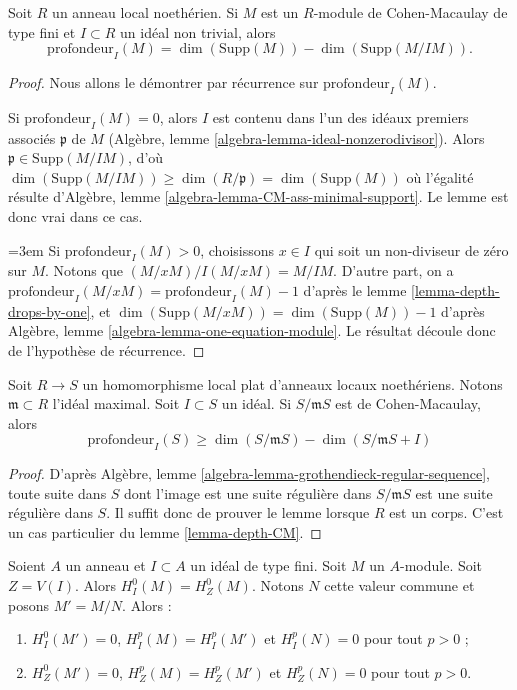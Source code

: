 \begin{lemma}
\label{lemma-depth-CM}
Soit $R$ un anneau local noethérien. Si $M$ est un
$R$-module de Cohen-Macaulay de type fini et $I \subset R$ un idéal non trivial, alors
$$
\text{profondeur}_I(M) = \dim(\text{Supp}(M)) - \dim(\text{Supp}(M/IM)).
$$
\end{lemma}

\begin{proof}
Nous allons le démontrer par récurrence sur $\text{profondeur}_I(M)$.

\medskip\noindent
Si $\text{profondeur}_I(M) = 0$, alors $I$ est contenu dans l'un des idéaux premiers
associés $\mathfrak p$ de $M$ (Algèbre, lemme \ref{algebra-lemma-ideal-nonzerodivisor}).
Alors $\mathfrak p \in \text{Supp}(M/IM)$, d'où
$\dim(\text{Supp}(M/IM)) \geq \dim(R/\mathfrak p) = \dim(\text{Supp}(M))$
où l'égalité résulte d'Algèbre, lemme \ref{algebra-lemma-CM-ass-minimal-support}.
Le lemme est donc vrai dans ce cas.

\medskip\noindent
{\emergencystretch=3em Si $\text{profondeur}_I(M) > 0$, choisissons $x \in I$ qui soit un non-diviseur de zéro sur $M$.
Notons que $(M/xM)/I(M/xM) = M/IM$. D'autre part, on a
$\text{profondeur}_I(M/xM) = \text{profondeur}_I(M) - 1$
d'après le lemme \ref{lemma-depth-drops-by-one}, et $\dim(\text{Supp}(M/xM)) = \dim(\text{Supp}(M)) -  1$
d'après Algèbre, lemme \ref{algebra-lemma-one-equation-module}.
Le résultat découle donc de l'hypothèse de récurrence.\par}
\end{proof}

\begin{lemma}
\label{lemma-depth-flat-CM}
Soit $R \to S$ un homomorphisme local plat d'anneaux locaux noethériens.
Notons $\mathfrak m \subset R$ l'idéal maximal.
Soit $I \subset S$ un idéal.
Si $S/\mathfrak mS$ est de Cohen-Macaulay, alors
$$
\text{profondeur}_I(S) \geq \dim(S/\mathfrak mS) - \dim(S/\mathfrak mS + I)
$$
\end{lemma}

\begin{proof}
D'après Algèbre, lemme \ref{algebra-lemma-grothendieck-regular-sequence}, toute suite dans $S$
dont l'image est une suite régulière dans $S/\mathfrak mS$
est une suite régulière dans $S$.
Il suffit donc de prouver le lemme lorsque $R$ est un corps.
C'est un cas particulier du lemme \ref{lemma-depth-CM}.
\end{proof}

\begin{lemma}
\label{lemma-divide-by-torsion}
Soient $A$ un anneau et $I \subset A$ un idéal de type fini.
Soit $M$ un $A$-module. Soit $Z = V(I)$.
Alors $H^0_I(M) = H^0_Z(M)$. Notons $N$ cette valeur commune
et posons $M' = M/N$. Alors :
\begin{enumerate}
\item $H^0_I(M') = 0$, $H^p_I(M) = H^p_I(M')$ et $H^p_I(N) = 0$
pour tout $p > 0$ ;
\item $H^0_Z(M') = 0$, $H^p_Z(M) = H^p_Z(M')$ et $H^p_Z(N) = 0$
pour tout $p > 0$.
\end{enumerate}
\end{lemma}

